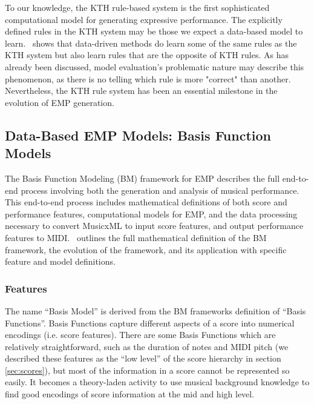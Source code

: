 
To our knowledge, the KTH rule-based system is the first sophisticated computational model for generating expressive performance. The explicitly defined rules in the KTH system may be those we expect a data-based model to learn.~\citet{widmer2002machine} shows that data-driven methods do learn some of the same rules as the KTH system but also learn rules that are the opposite of KTH rules. As has already been discussed, model evaluation's problematic nature may describe this phenomenon, as there is no telling which rule is more "correct" than another. Nevertheless, the KTH rule system has been an essential milestone in the evolution of EMP generation. 

\subsection{Data-Based EMP Models: Basis Function Models}\label{sec:data-based}
The Basis Function Modeling (BM) framework for EMP describes the full end-to-end process involving both the generation and analysis of musical performance. This end-to-end process includes mathematical definitions of both score and performance features, computational models for EMP, and the data processing necessary to convert MusicxML to input score features, and output performance features to MIDI.~\citet{eduardo2018computational} outlines the full mathematical definition of the BM framework, the evolution of the framework, and its application with specific feature and model definitions.

\subsubsection{Features}
The name ``Basis Model'' is derived from the BM frameworks definition of ``Basis Functions''. Basis Functions capture different aspects of a score into numerical encodings (i.e. score features). There are some Basis Functions which are relatively straightforward, such as the duration of notes and MIDI pitch (we described these features as the ``low level'' of the score hierarchy in section \ref{sec:scores}), but most of the information in a score cannot be represented so easily. It becomes a theory-laden activity to use musical background knowledge to find good encodings of score information at the mid and high level.

